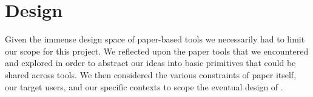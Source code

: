 \documentclass{sig-alternate}
\begin{document}

\section{Design}

Given the immense design space of paper-based tools we necessarily had to limit our scope for this project. We reflected upon the paper tools that we encountered and explored in order to abstract our ideas into basic primitives that could be shared across tools. We then considered the various constraints of paper itself, our target users, and our specific contexts to scope the eventual design of \nifty.


\end{document}
